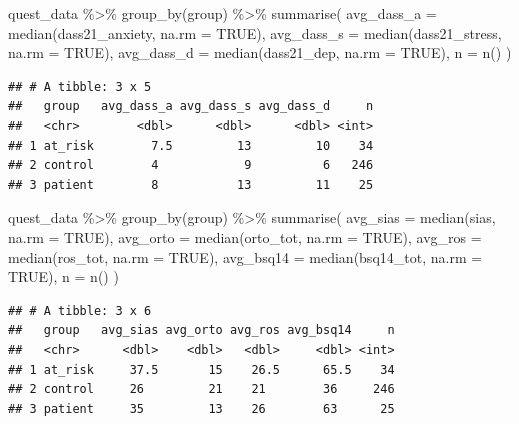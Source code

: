 \documentclass[
]{article}
\newenvironment{Shaded}{\begin{snugshade}}{\end{snugshade}}
\newcommand{\AttributeTok}[1]{\textcolor[rgb]{0.77,0.63,0.00}{#1}}
\newcommand{\ConstantTok}[1]{\textcolor[rgb]{0.00,0.00,0.00}{#1}}
\newcommand{\FunctionTok}[1]{\textcolor[rgb]{0.00,0.00,0.00}{#1}}
\newcommand{\NormalTok}[1]{#1}
\newcommand{\SpecialCharTok}[1]{\textcolor[rgb]{0.00,0.00,0.00}{#1}}
\begin{document}
\begin{Shaded}
\begin{Highlighting}[]
\NormalTok{quest\_data }\SpecialCharTok{\%\textgreater{}\%} 
  \FunctionTok{group\_by}\NormalTok{(group) }\SpecialCharTok{\%\textgreater{}\%} 
  \FunctionTok{summarise}\NormalTok{(}
    \AttributeTok{avg\_dass\_a =} \FunctionTok{median}\NormalTok{(dass21\_anxiety, }\AttributeTok{na.rm =} \ConstantTok{TRUE}\NormalTok{), }
    \AttributeTok{avg\_dass\_s  =} \FunctionTok{median}\NormalTok{(dass21\_stress, }\AttributeTok{na.rm =} \ConstantTok{TRUE}\NormalTok{), }
    \AttributeTok{avg\_dass\_d  =} \FunctionTok{median}\NormalTok{(dass21\_dep, }\AttributeTok{na.rm =} \ConstantTok{TRUE}\NormalTok{),}
    \AttributeTok{n =} \FunctionTok{n}\NormalTok{()}
\NormalTok{  )}
\end{Highlighting}
\end{Shaded}

\begin{verbatim}
## # A tibble: 3 x 5
##   group   avg_dass_a avg_dass_s avg_dass_d     n
##   <chr>        <dbl>      <dbl>      <dbl> <int>
## 1 at_risk        7.5         13         10    34
## 2 control        4            9          6   246
## 3 patient        8           13         11    25
\end{verbatim}

\begin{Shaded}
\begin{Highlighting}[]
\NormalTok{quest\_data }\SpecialCharTok{\%\textgreater{}\%} 
  \FunctionTok{group\_by}\NormalTok{(group) }\SpecialCharTok{\%\textgreater{}\%} 
  \FunctionTok{summarise}\NormalTok{(}
    \AttributeTok{avg\_sias =} \FunctionTok{median}\NormalTok{(sias, }\AttributeTok{na.rm =} \ConstantTok{TRUE}\NormalTok{), }
    \AttributeTok{avg\_orto  =} \FunctionTok{median}\NormalTok{(orto\_tot, }\AttributeTok{na.rm =} \ConstantTok{TRUE}\NormalTok{), }
    \AttributeTok{avg\_ros  =} \FunctionTok{median}\NormalTok{(ros\_tot, }\AttributeTok{na.rm =} \ConstantTok{TRUE}\NormalTok{),}
    \AttributeTok{avg\_bsq14  =} \FunctionTok{median}\NormalTok{(bsq14\_tot, }\AttributeTok{na.rm =} \ConstantTok{TRUE}\NormalTok{),}
    \AttributeTok{n =} \FunctionTok{n}\NormalTok{()}
\NormalTok{  )}
\end{Highlighting}
\end{Shaded}

\begin{verbatim}
## # A tibble: 3 x 6
##   group   avg_sias avg_orto avg_ros avg_bsq14     n
##   <chr>      <dbl>    <dbl>   <dbl>     <dbl> <int>
## 1 at_risk     37.5       15    26.5      65.5    34
## 2 control     26         21    21        36     246
## 3 patient     35         13    26        63      25
\end{verbatim}
\end{document}
